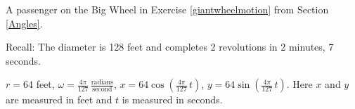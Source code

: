 {A passenger on the Big Wheel in Exercise \ref{giantwheelmotion} from Section \ref{Angles}.

Recall: The diameter is 128 feet and completes 2 revolutions in 2 minutes, 7 seconds.}
{$r = 64$ feet, $\omega = \frac{4\pi}{127} \, \frac{\text{radians}}{\text{second}}$,  $x = 64 \cos\left(\frac{4\pi}{127} \, t \right)$, $y = 64 \sin\left(\frac{4\pi}{127} \, t \right)$.  Here $x$ and $y$ are measured in feet and $t$ is measured in seconds.}
